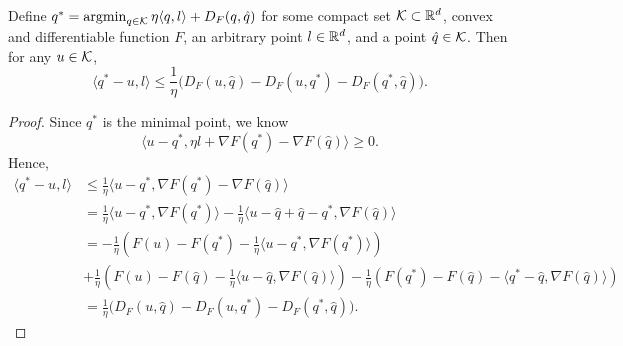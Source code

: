 \documentclass[11pt]{article}
\begin{document}
\begin{lemma}
\label{lem: bound of mirror descent}
Define $q^* = \mathop{\mathrm{argmin}}_{q\in \mathcal{K}} \eta \langle q, l \rangle + D_F (q, \hat q)$ for some compact set $\mathcal{K} \subset \mathbb{R}^d$, convex and differentiable function $F$, an arbitrary point $l\in \mathbb{R}^d$, and a point $\hat q \in \mathcal{K}$. Then for any $u\in \mathcal{K}$, 
\[
    \langle q^* -u, l \rangle  \le \frac{1}{\eta} \big( D_F (u,\hat q) - D_F (u,q^*) - D_F(q^*, \hat q) \big). 
\]

\end{lemma}
\begin{proof}
Since $q^*$ is the minimal point, we know
\[
    \langle u-q^*, \eta l + \nabla F(q^*) - \nabla F(\hat q) \rangle \ge 0.  
\]
Hence, 
\begin{align*}
    \langle q^*-u, l \rangle &\le \frac{1}{\eta} \langle u-q^*,  \nabla F(q^*) - \nabla F(\hat q) \rangle \\ 
    & =   \frac{1}{\eta} \langle u-q^*,  \nabla F(q^*)  \rangle  - \frac{1}{\eta} \langle u-\hat q + \hat q - q^*,   \nabla F(\hat q) \rangle\\ 
    & = -\frac{1}{\eta}(F(u) - F(q^*) -  \frac{1}{\eta} \langle u-q^*,  \nabla F(q^*)  \rangle) \\ 
    &+ \frac{1}{\eta}(F(u) - F(\hat q) -\frac{1}{\eta} \langle u-\hat q ,   \nabla F(\hat q) \rangle) -\frac{1}{\eta}  (F(q^*) - F(\hat q) -\langle q^*-\hat q ,   \nabla F(\hat q) \rangle)\\ 
    & =  \frac{1}{\eta} \big( D_F (u,\hat q) - D_F (u,q^*) - D_F(q^*, \hat q) \big). 
\end{align*}
\end{proof}



\end{document}
